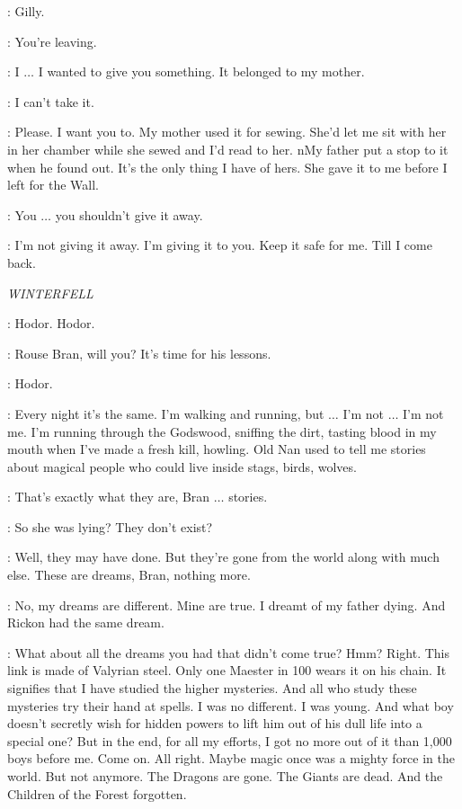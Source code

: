 \SAM: Gilly. 

\GILLY: You're leaving. 

\SAM: I $\ldots$ I wanted to give you something. It belonged to my mother. 


\GILLY: I can't take it. 

\SAM: Please. I want you to. My mother used it for sewing. She'd let me sit with her in her chamber while she sewed and I'd read to her. nMy father put a stop to it when he found out. It's the only thing I have of hers. She gave it to me before I left for the Wall. 

\GILLY: You $\ldots$ you shouldn't give it away. 

\SAM: I'm not giving it away. I'm giving it to you. Keep it safe for me. Till I come back. 



\scene

\textit{WINTERFELL} 


\HODOR: Hodor. Hodor. 

\LUWIN: Rouse Bran, will you? It's time for his lessons. 


\HODOR: Hodor. 


\BRAN: Every night it's the same. I'm walking and running, but $\ldots$ I'm not $\ldots$ I'm not me. I'm running through the Godswood, sniffing the dirt, tasting blood in my mouth when I've made a fresh kill, howling. Old Nan used to tell me stories about magical people who could live inside stags, birds, wolves. 

\LUWIN: That's exactly what they are, Bran $\ldots$ stories. 

\BRAN: So she was lying? They don't exist? 

\LUWIN: Well, they may have done. But they're gone from the world along with much else. These are dreams, Bran, nothing more. 

\BRAN: No, my dreams are different. Mine are true. I dreamt of my father dying. And Rickon had the same dream. 

\LUWIN: What about all the dreams you had that didn't come true? Hmm?  Right. This link is made of Valyrian steel. Only one Maester in 100 wears it on his chain. It signifies that I have studied the higher mysteries. And all who study these mysteries try their hand at spells. I was no different. I was young. And what boy doesn't secretly wish for hidden powers to lift him out of his dull life into a special one? But in the end, for all my efforts, I got no more out of it than 1,000 boys before me. Come on.  All right. Maybe magic once was a mighty force in the world. But not anymore. The Dragons are gone. The Giants are dead. And the Children of the Forest forgotten. 


